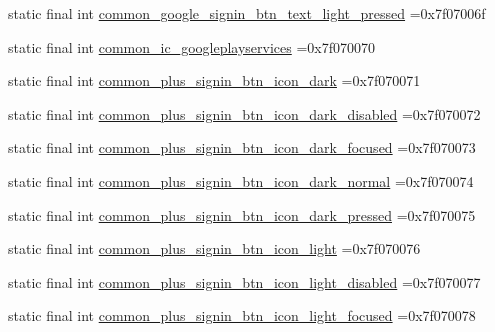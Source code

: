 \begin{DoxyCompactItemize}
\item 
static final int \mbox{\hyperlink{classbr_1_1unb_1_1cic_1_1mp_1_1marketmaster_1_1test_1_1R_1_1drawable_ac8399352ef50004ecb5b645c829c0d2d}{common\+\_\+google\+\_\+signin\+\_\+btn\+\_\+text\+\_\+light\+\_\+pressed}} =0x7f07006f
\item 
static final int \mbox{\hyperlink{classbr_1_1unb_1_1cic_1_1mp_1_1marketmaster_1_1test_1_1R_1_1drawable_ae844fab910f854090547625d7c6621ca}{common\+\_\+ic\+\_\+googleplayservices}} =0x7f070070
\item 
static final int \mbox{\hyperlink{classbr_1_1unb_1_1cic_1_1mp_1_1marketmaster_1_1test_1_1R_1_1drawable_a6b9f98ad62e0dae29a27e99cfc449175}{common\+\_\+plus\+\_\+signin\+\_\+btn\+\_\+icon\+\_\+dark}} =0x7f070071
\item 
static final int \mbox{\hyperlink{classbr_1_1unb_1_1cic_1_1mp_1_1marketmaster_1_1test_1_1R_1_1drawable_a0b0cfd0286febe3ce961d4d93aea3502}{common\+\_\+plus\+\_\+signin\+\_\+btn\+\_\+icon\+\_\+dark\+\_\+disabled}} =0x7f070072
\item 
static final int \mbox{\hyperlink{classbr_1_1unb_1_1cic_1_1mp_1_1marketmaster_1_1test_1_1R_1_1drawable_a4dc766a7d78528c17599fd97fc22c29e}{common\+\_\+plus\+\_\+signin\+\_\+btn\+\_\+icon\+\_\+dark\+\_\+focused}} =0x7f070073
\item 
static final int \mbox{\hyperlink{classbr_1_1unb_1_1cic_1_1mp_1_1marketmaster_1_1test_1_1R_1_1drawable_ab61a348ba2130dec264d338ca6e7edcd}{common\+\_\+plus\+\_\+signin\+\_\+btn\+\_\+icon\+\_\+dark\+\_\+normal}} =0x7f070074
\item 
static final int \mbox{\hyperlink{classbr_1_1unb_1_1cic_1_1mp_1_1marketmaster_1_1test_1_1R_1_1drawable_a238bf2f1aa5140b53dae6ce3d417b282}{common\+\_\+plus\+\_\+signin\+\_\+btn\+\_\+icon\+\_\+dark\+\_\+pressed}} =0x7f070075
\item 
static final int \mbox{\hyperlink{classbr_1_1unb_1_1cic_1_1mp_1_1marketmaster_1_1test_1_1R_1_1drawable_a67b1ee57099b934148fbfc0c0ad2d74d}{common\+\_\+plus\+\_\+signin\+\_\+btn\+\_\+icon\+\_\+light}} =0x7f070076
\item 
static final int \mbox{\hyperlink{classbr_1_1unb_1_1cic_1_1mp_1_1marketmaster_1_1test_1_1R_1_1drawable_ae32b0ae0fa8dbea6eaf8c52e46ccf4b8}{common\+\_\+plus\+\_\+signin\+\_\+btn\+\_\+icon\+\_\+light\+\_\+disabled}} =0x7f070077
\item 
static final int \mbox{\hyperlink{classbr_1_1unb_1_1cic_1_1mp_1_1marketmaster_1_1test_1_1R_1_1drawable_ac364f354a750b6c1ab1d223e5de8adf0}{common\+\_\+plus\+\_\+signin\+\_\+btn\+\_\+icon\+\_\+light\+\_\+focused}} =0x7f070078

\end{DoxyCompactItemize}
